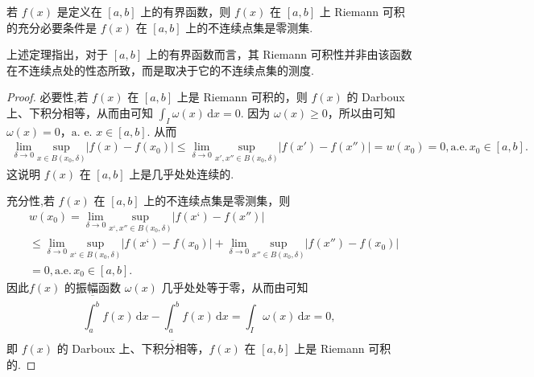 \documentclass[../../main.tex]{subfiles}
\begin{document}
\begin{theorem}\label{theorem:定理4.24}
若 \( f(x) \) 是定义在 \( [a,b] \) 上的有界函数，则 \( f(x) \) 在 \( [a,b] \) 上 Riemann 可积的充分必要条件是 \( f(x) \) 在 \( [a,b] \) 上的不连续点集是零测集.
\end{theorem}
\begin{note}
上述定理指出，对于 \( [a,b] \) 上的有界函数而言，其 Riemann 可积性并非由该函数在不连续点处的性态所致，而是取决于它的不连续点集的测度.
\end{note}
\begin{proof}
必要性,若 \( f(x) \) 在 \( [a,b] \) 上是 Riemann 可积的，则 \( f(x) \) 的 Darboux 上、下积分相等，从而由可知 \( \int_I \omega(x) \, \mathrm{d}x = 0 \). 因为 \( \omega(x) \geq 0 \)，所以由可知\( \omega(x) = 0 \)，\(\text{a. e.}\) \( x \in [a,b] \). 从而
\begin{align*}
\underset{\delta \rightarrow 0}{\lim}\underset{x\in B\left( x_0,\delta \right)}{\mathrm{sup}}|f(x)-f(x_0)|\leqslant \underset{\delta \rightarrow 0}{\lim}\underset{x',x'' \in B\left( x_0,\delta \right)}{\mathrm{sup}}|f\left( x' \right) -f\left( x'' \right) |=w(x_0)=0,\mathrm{a}.\mathrm{e}.\,x_0\in \left[ a,b \right] .
\end{align*}
这说明 \( f(x) \) 在 \( [a,b] \) 上是几乎处处连续的.

充分性,若 \( f(x) \) 在 \( [a,b] \) 上的不连续点集是零测集，则
\begin{align*}
&w(x_0)=\underset{\delta \rightarrow 0}{\lim}\underset{x‘,x'' \in B\left( x_0,\delta \right)}{\mathrm{sup}}|f\left( x‘\right) -f\left( x'' \right) |
\\
&\leqslant \underset{\delta \rightarrow 0}{\lim}\underset{x‘\in B\left( x_0,\delta \right)}{\mathrm{sup}}|f(x‘)-f(x_0)|+\underset{\delta \rightarrow 0}{\lim}\underset{x'' \in B\left( x_0,\delta \right)}{\mathrm{sup}}|f(x'' )-f(x_0)|
\\
&=0,\mathrm{a}.\mathrm{e}.\,x_0\in \left[ a,b \right] .
\end{align*}
因此\( f(x) \) 的振幅函数 \( \omega(x) \) 几乎处处等于零，从而由可知
\[
\overline{\int_a^b} f(x) \, \mathrm{d}x - \underline{\int_a^b} f(x) \, \mathrm{d}x = \int_I \omega(x) \, \mathrm{d}x = 0,
\]
即 \( f(x) \) 的 Darboux 上、下积分相等，\( f(x) \) 在 \( [a,b] \) 上是 Riemann 可积的.
\end{proof}
\end{document}
